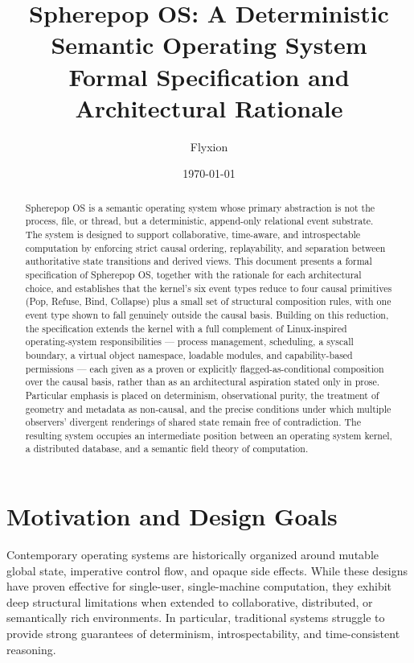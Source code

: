 \documentclass[11pt]{article}
\title{Spherepop OS: A Deterministic Semantic Operating System\\ \large Formal Specification and Architectural Rationale}
\author{Flyxion}
\date{\today}
\begin{document}
\maketitle

\begin{abstract}

Spherepop OS is a semantic operating system whose primary abstraction is not the process, file, or thread, but a deterministic, append-only relational event substrate. The system is designed to support collaborative, time-aware, and introspectable computation by enforcing strict causal ordering, replayability, and separation between authoritative state transitions and derived views. This document presents a formal specification of Spherepop OS, together with the rationale for each architectural choice, and establishes that the kernel's six event types reduce to four causal primitives (Pop, Refuse, Bind, Collapse) plus a small set of structural composition rules, with one event type shown to fall genuinely outside the causal basis. Building on this reduction, the specification extends the kernel with a full complement of Linux-inspired operating-system responsibilities --- process management, scheduling, a syscall boundary, a virtual object namespace, loadable modules, and capability-based permissions --- each given as a proven or explicitly flagged-as-conditional composition over the causal basis, rather than as an architectural aspiration stated only in prose. Particular emphasis is placed on determinism, observational purity, the treatment of geometry and metadata as non-causal, and the precise conditions under which multiple observers' divergent renderings of shared state remain free of contradiction. The resulting system occupies an intermediate position between an operating system kernel, a distributed database, and a semantic field theory of computation.
\end{abstract}

\section{Motivation and Design Goals}

Contemporary operating systems are historically organized around mutable global state, imperative control flow, and opaque side effects. While these designs have proven effective for single-user, single-machine computation, they exhibit deep structural limitations when extended to collaborative, distributed, or semantically rich environments. In particular, traditional systems struggle to provide strong guarantees of determinism, introspectability, and time-consistent reasoning.
\end{document}
